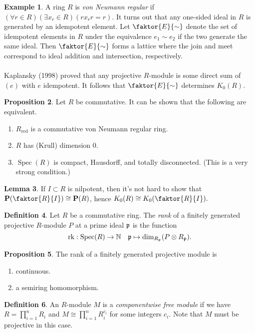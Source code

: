 \documentclass[10pt,letterpaper,cm]{nupset}
\theoremstyle{definition}
\newtheorem{definition}{Definition}
\newtheorem{exmp}[definition]{Example}
\theoremstyle{theorem}
\newtheorem{lemma}[definition]{Lemma}
\newtheorem{prop}[definition]{Proposition}
\theoremstyle{remark}
\newcommand{\N}{\mathbb N}
\renewcommand{\P}{\mathbf P}
\newcommand{\1}{\mathbf{1}}
\newcommand{\0}{\vec 0}
\DeclareMathOperator{\red}{red}
\DeclareMathOperator{\spec}{Spec}
\DeclareMathOperator{\rk}{rk}
\begin{document}
\begin{exmp}
A ring $R$ is \textit{von Neumann regular} if $(\forall r \in R)(\exists x_r\in R)(rx_rr=r)$. It turns out that any one-sided ideal in $R$ is generated by an idempotent element. Let $\faktor{E}{\sim}$ denote the set of idempotent elements in $R$ under the equivalence $e_1 \sim e_2$ if the two generate the same ideal. Then  $\faktor{E}{\sim}$  forms a lattice where the join and meet correspond to ideal addition and intersection, respectively.
\\ \\ Kaplansky (1998) proved that any projective $R$-module is some direct sum of $(e)$ with $e$ idempotent. It follows that $\faktor{E}{\sim}$ determines $K_0(R)$.
\end{exmp}

\begin{prop}\label{Krull}
Let $R$ be commutative. It can be shown that the following are equivalent.
\begin{enumerate}
\item $R_{\red}$ is a commutative von Neumann regular ring.
\item $R$ has (Krull) dimension $0$.
\item $\spec(R)$ is compact, Hausdorff, and totally disconnected. (This is a very strong condition.)
\end{enumerate}
\end{prop}

\begin{lemma}\label{L5}
If $I\subset R$ is nilpotent, then it's not hard to show that $\P(\faktor{R}{I}) \cong \P(R)$, hence $K_0(R) \cong K_0(\faktor{R}{I}).$
\end{lemma}

\begin{definition}
Let $R$ be a commutative ring. The \textit{rank} of a finitely generated projective $R$-module $P$ at a prime ideal $\frak{p}$ is the function $$\rk: \spec(R) \to \N \quad \frak{p} \mapsto \dim_{R_{\frak{p}}} (P \otimes R_{\frak{p}}).$$
\end{definition}
\begin{prop} The rank of a finitely generated projective module is
\begin{enumerate}
\item continuous.
\item a semiring homomorphism.
\end{enumerate}
\end{prop}

\begin{definition}
An $R$-module $M$ is a \textit{componentwise free module} if we have $R = \prod_{i=1}^n R_i$ and $M \cong \prod_{i=1}^n R_i^{c_i}$ for some integers $c_i$. Note that $M$ must be projective in this case.
\end{definition}
\end{document}

